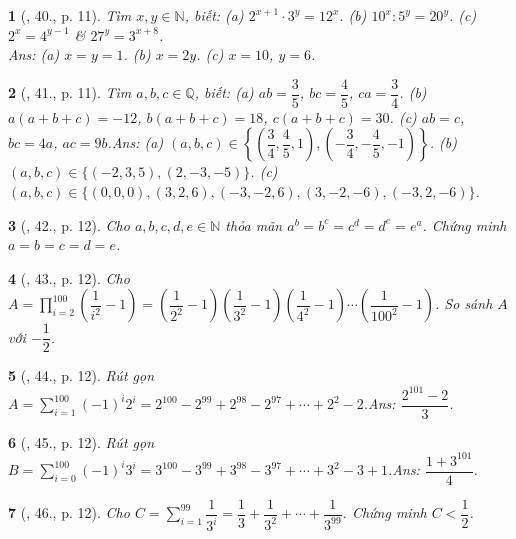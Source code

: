 \documentclass{article}
\newtheorem{baitoan}{}
\begin{document}
\begin{baitoan}[\cite{Binh_Toan_7_tap_1}, 40., p. 11]
	Tìm $x,y\in\mathbb{N}$, biết: (a) $2^{x+1}\cdot 3^y = 12^x$. (b) $10^x:5^y = 20^y$.	(c) $2^x = 4^{y-1}$ \& $27^y = 3^{x+8}$.\\\mbox{}\hfill{\sf Ans: (a) $x = y = 1$. (b) $x = 2y$. (c) $x = 10$, $y = 6$.}
\end{baitoan}

\begin{baitoan}[\cite{Binh_Toan_7_tap_1}, 41., p. 11]
	Tìm $a,b,c\in\mathbb{Q}$, biết: (a) $ab = \dfrac{3}{5}$, $bc = \dfrac{4}{5}$, $ca = \dfrac{3}{4}$.	(b) $a(a + b + c) = -12$, $b(a + b + c) = 18$, $c(a + b + c) = 30$. (c) $ab = c$, $bc = 4a$, $ac = 9b$.\hfill{\sf Ans: (a) $(a,b,c)\in\left\{\left(\dfrac{3}{4},\dfrac{4}{5},1\right),\left(-\dfrac{3}{4},-\dfrac{4}{5},-1\right)\right\}$. (b) $(a,b,c)\in\{(-2,3,5),(2,-3,-5)\}$. (c) $(a,b,c)\in\{(0,0,0),(3,2,6),(-3,-2,6),(3,-2,-6),(-3,2,-6)\}$.}
\end{baitoan}

\begin{baitoan}[\cite{Binh_Toan_7_tap_1}, 42., p. 12]
	Cho $a,b,c,d,e\in\mathbb{N}$ thỏa mãn $a^b = b^c = c^d = d^e = e^a$. Chứng minh $a = b = c = d = e$.
\end{baitoan}

\begin{baitoan}[\cite{Binh_Toan_7_tap_1}, 43., p. 12]
	Cho $A = \prod_{i=2}^{100} \left(\dfrac{1}{i^2} - 1\right) = \left(\dfrac{1}{2^2} - 1\right)\left(\dfrac{1}{3^2} - 1\right)\left(\dfrac{1}{4^2} - 1\right)\cdots\left(\dfrac{1}{100^2} - 1\right)$. So sánh $A$ với $-\dfrac{1}{2}$.
\end{baitoan}

\begin{baitoan}[\cite{Binh_Toan_7_tap_1}, 44., p. 12]
	Rút gọn $A = \sum_{i=1}^{100} (-1)^i2^i = 2^{100} - 2^{99} + 2^{98} - 2^{97} + \cdots + 2^2 - 2$.\hfill{\sf Ans: $\dfrac{2^{101} - 2}{3}$.}
\end{baitoan}

\begin{baitoan}[\cite{Binh_Toan_7_tap_1}, 45., p. 12]
	Rút gọn $B = \sum_{i=0}^{100} (-1)^i3^i = 3^{100} - 3^{99} + 3^{98} - 3^{97} + \cdots + 3^2 - 3 + 1$.\hfill{\sf Ans: $\dfrac{1 + 3^{101}}{4}$.}
\end{baitoan}

\begin{baitoan}[\cite{Binh_Toan_7_tap_1}, 46., p. 12]
	Cho $C = \sum_{i=1}^{99} \dfrac{1}{3^i} = \dfrac{1}{3} + \dfrac{1}{3^2} + \cdots + \dfrac{1}{3^{99}}$. Chứng minh $C < \dfrac{1}{2}$.
\end{baitoan}
\end{document}

